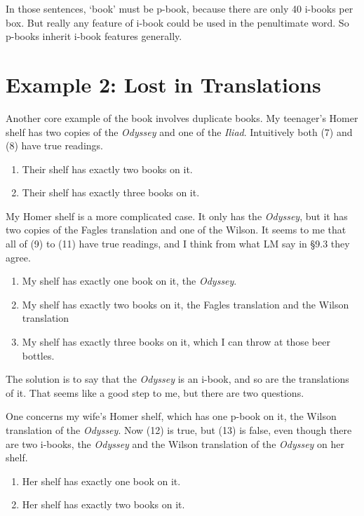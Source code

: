 \documentclass[
  11pt,
  letterpaper,
  DIV=11,
  numbers=noendperiod,
  twoside]{scrartcl}
\providecommand{\tightlist}{%
  \setlength{\itemsep}{0pt}\setlength{\parskip}{0pt}}
\begin{document}
In those sentences, `book' must be p-book, because there are only 40
i-books per box. But really any feature of i-book could be used in the
penultimate word. So p-books inherit i-book features generally.

\section{Example 2: Lost in
Translations}\label{example-2-lost-in-translations}

Another core example of the book involves duplicate books. My teenager's
Homer shelf has two copies of the \emph{Odyssey} and one of the
\emph{Iliad}. Intuitively both (7) and (8) have true readings.

\begin{enumerate}
\def\labelenumi{(\arabic{enumi})}
\setcounter{enumi}{6}
\tightlist
\item
  Their shelf has exactly two books on it.
\item
  Their shelf has exactly three books on it.
\end{enumerate}

My Homer shelf is a more complicated case. It only has the
\emph{Odyssey}, but it has two copies of the Fagles translation and one
of the Wilson. It seems to me that all of (9) to (11) have true
readings, and I think from what LM say in §9.3 they agree.

\begin{enumerate}
\def\labelenumi{(\arabic{enumi})}
\setcounter{enumi}{8}
\tightlist
\item
  My shelf has exactly one book on it, the \emph{Odyssey}.
\item
  My shelf has exactly two books on it, the Fagles translation and the
  Wilson translation
\item
  My shelf has exactly three books on it, which I can throw at those
  beer bottles.
\end{enumerate}

The solution is to say that the \emph{Odyssey} is an i-book, and so are
the translations of it. That seems like a good step to me, but there are
two questions.

One concerns my wife's Homer shelf, which has one p-book on it, the
Wilson translation of the \emph{Odyssey}. Now (12) is true, but (13) is
false, even though there are two i-books, the \emph{Odyssey} and the
Wilson translation of the \emph{Odyssey} on her shelf.

\begin{enumerate}
\def\labelenumi{(\arabic{enumi})}
\setcounter{enumi}{11}
\tightlist
\item
  Her shelf has exactly one book on it.
\item
  Her shelf has exactly two books on it.
\end{enumerate}
\end{document}
